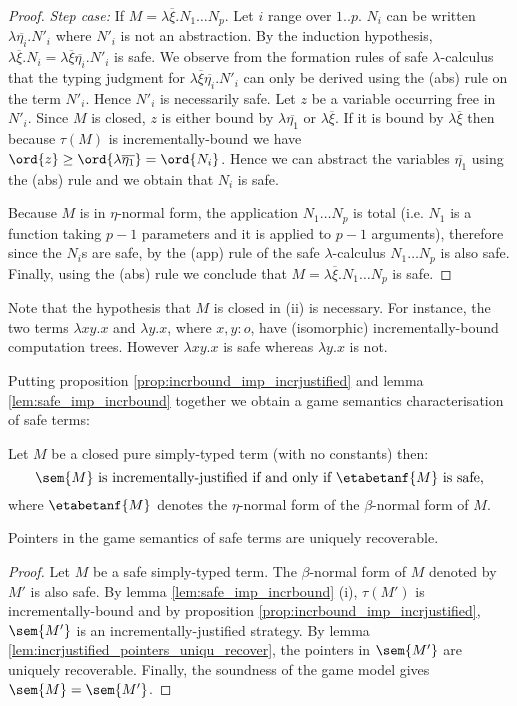 \begin{proof}
\emph{Step case:} If $M = \lambda \overline{\xi} . N_1 \ldots N_p$.
Let $i$ range over $1..p$. $N_i$ can be written $\lambda
\overline{\eta_i} . N'_i$ where $N'_i$ is not an abstraction. By the
induction hypothesis, $\lambda \overline{\xi} . N_i = \lambda
\overline{\xi} \overline{\eta_i} . N'_i$ is safe. We observe from
the formation rules of safe $\lambda$-calculus that the typing
judgment for $\lambda \overline{\xi} \overline{\eta_i} . N'_i$ can
only be derived using the (abs) rule on the term $N'_i$. Hence
$N'_i$ is necessarily safe. Let $z$ be a variable occurring free in
$N'_i$. Since $M$ is closed, $z$ is either bound by $\lambda
\overline{\eta_1}$ or $\lambda \overline{\xi}$. If it is bound by
$\lambda \overline{\xi}$ then because $\tau(M)$ is
incrementally-bound we have $\ord{z} \geq \ord{\lambda
\overline{\eta_1}} = \ord{N_i}$. Hence we can abstract the variables
$\overline{\eta_1}$ using the (abs) rule and we obtain that $N_i$ is
safe.

Because $M$ is in $\eta$-normal form, the application $N_1 \ldots
N_p$ is total (i.e. $N_1$ is a function taking $p-1$ parameters and
it is applied to $p-1$ arguments), therefore since the $N_i$s are
safe, by the (app) rule of the safe $\lambda$-calculus $N_1 \ldots
N_p$ is also safe. Finally, using the (abs) rule we conclude that $M
= \lambda \overline{\xi} . N_1 \ldots N_p$ is safe.
\end{proof}

Note that the hypothesis that $M$ is closed in (ii) is necessary.  For instance, the two terms
$\lambda x y .x$ and $\lambda y . x$, where $x,y:o$, have (isomorphic) incrementally-bound computation trees. However $\lambda x y .x$ is safe
whereas $\lambda y . x$ is not.



Putting proposition \ref{prop:incrbound_imp_incrjustified} and lemma \ref{lem:safe_imp_incrbound} together we
obtain a game semantics characterisation of safe terms:
\begin{cor}
Let $M$ be a closed pure simply-typed term (with no constants) then:
$$ \sem{M} \mbox{ is incrementally-justified if and only if $\etabetanf{M}$ is safe,} $$
where $\etabetanf{M}$ denotes the $\eta$-normal form of the $\beta$-normal form of $M$.
\end{cor}



\begin{thm}
Pointers in the game semantics of safe terms are uniquely recoverable.
\end{thm}
\begin{proof}
Let $M$ be a safe simply-typed term. The $\beta$-normal form of $M$ denoted by $M'$ is also safe.
By lemma \ref{lem:safe_imp_incrbound} (i), $\tau(M')$ is incrementally-bound and
by proposition \ref{prop:incrbound_imp_incrjustified},
$\sem{M'}$ is an incrementally-justified strategy.
By lemma \ref{lem:incrjustified_pointers_uniqu_recover}, the pointers in $\sem{M'}$ are uniquely recoverable.
Finally, the soundness of the game model gives $\sem{M} = \sem{M'}$.
\end{proof}


